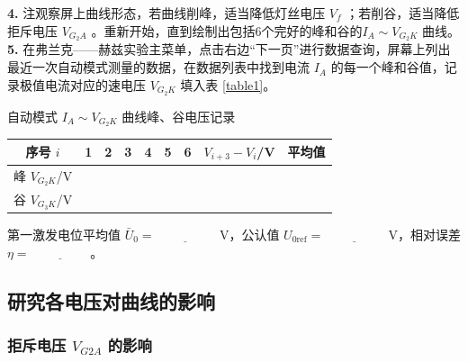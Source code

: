 \documentclass{../template/myrpt}
\begin{document}
\begin{minipage}[t]{0.95\linewidth}
\textbf{4.} 注观察屏上曲线形态，若曲线削峰，适当降低灯丝电压 $V_f$ ；若削谷，适当降低拒斥电压 $ V_{G_2A}$ 。重新开始，直到绘制出包括6个完好的峰和谷的$I_A \sim V_{G_2K}$ 曲线。\\
\textbf{5.} 在弗兰克——赫兹实验主菜单，点击右边“下一页”进行数据查询，屏幕上列出最近一次自动模式测量的数据，在数据列表中找到电流 $I_A$ 的每一个峰和谷值，记录极值电流对应的速电压 $V_{G_2K}$ 填入表 \ref{table1}。
  
\end{minipage}


\begin{LabRecordTable}
\centering
\caption{自动模式 $I_A \sim V_{G_2K}$ 曲线峰、谷电压记录}
\label{table1}
\setlength{\tabcolsep}{3pt} %
\begin{tabularx}{\textwidth}{c *{6}{C} *{3}{c} C} %
\toprule
{序号 $i$} & 1 & 2 & 3 & 4 & 5 & 6 
&  
& \mbox{平均值} \\
\midrule
峰 $V_{G_2K}$/V & & & & & & & & & & \\
谷 $V_{G_3K}$/V & & & & & & & & & & \\
\bottomrule
\end{tabularx}
\end{LabRecordTable}



第一激发电位平均值 $\bar{U}_0 = \underline{\hspace{2cm}}$ V，公认值 $U_{0\text{ref}} = \underline{\hspace{2cm}}$ V，相对误差 $\eta = \underline{\hspace{2cm}}$。

\subsection{研究各电压对曲线的影响}


\subsubsection{拒斥电压 $V_{G2A}$ 的影响}
\end{document}
